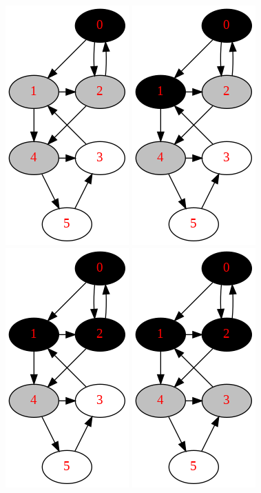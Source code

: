 \documentclass[../main.tex]{subfiles}
\begin{document}
\begin{figure}[!ht]
     \includegraphics[width=0.2\columnwidth]{fig/breath_first_graph_search_process4.png}
    \includegraphics[width=0.2\columnwidth]{fig/breath_first_graph_search_process5.png}
    \includegraphics[width=0.2\columnwidth]{fig/breath_first_graph_search_process6.png}
    \includegraphics[width=0.2\columnwidth]{fig/breath_first_graph_search_process7.png}
    

\end{figure}
\end{document}
